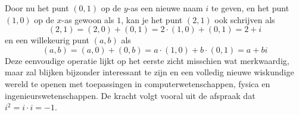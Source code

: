 \documentclass{ximera}
\begin{document}
Door nu het punt \((0,1)\) op de $y$-as een nieuwe naam $i$ te geven, en het punt \((1,0)\) op de $x$-as gewoon als  $1$,  
kan je het punt \((2,1)\) ook schrijven als 
\[
	(2,1) = (2,0) + (0,1) = 2\cdot(1,0) + (0,1) = 2 + i
\]
en een willekeurig punt \((a,b)\) als 
\[
	(a,b) = (a,0) + (0,b) = a\cdot(1,0) + b\cdot(0,1) = a + bi
\]
Deze eenvoudige operatie lijkt op het eerste zicht misschien wat merkwaardig, maar zal blijken bijzonder interessant te zijn en een volledig nieuwe wiskundige wereld te openen met toepassingen in computerwetenschappen, fysica en ingenieurswetenschappen.
De kracht volgt vooral uit de afspraak dat $i^2=i\cdot i=-1$.


\end{document}

